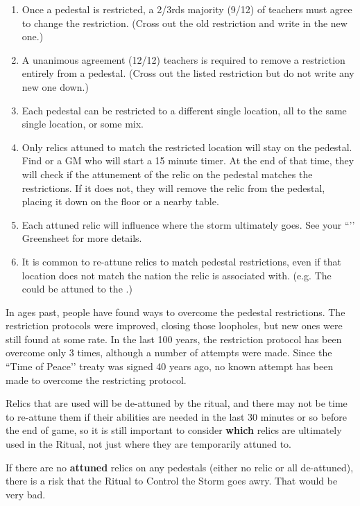 \documentclass[green]{GL2020}
\begin{document}
\begin{enumerate}
\begin{enumerate}
	\item Once a pedestal is restricted, a 2/3rds majority (9/12) of teachers must agree to change the restriction. (Cross out the old restriction and write in the new one.)
	\item  A unanimous agreement (12/12) teachers is required to remove a restriction entirely from a pedestal. (Cross out the listed restriction  but do not write any new one down.)
	\item  Each pedestal can be restricted to a different single location, all to the same single location, or some mix.
	\item Only relics attuned to match the restricted location will stay on the pedestal. Find \cPrincipal{} or a GM who will start a 15 minute timer. At the end of that time, they will check if the attunement of the relic on the pedestal matches the restrictions. If it does not, they will remove the relic from the pedestal, placing it down on the floor or a nearby table.
	\item Each attuned relic will influence where the storm ultimately goes. See your ``\gVotingStones{}’’ Greensheet for more details.
	\item It is common to re-attune relics to match pedestal restrictions, even if that location does not match the nation the relic is associated with. (e.g. The \iPitcher{} could be attuned to the \pShip{}.)
\end{enumerate}
\end{enumerate}

In ages past, people have found ways to overcome the pedestal restrictions. The restriction protocols were improved, closing those loopholes, but new ones were still found at some rate. In the last 100 years, the restriction protocol has been overcome only 3 times, although a number of attempts were made. Since the ``Time of Peace’’ treaty was signed 40 years ago, no known attempt has been made to overcome the restricting protocol.

Relics that are used will be de-attuned by the ritual, and there may not be time to re-attune them if their abilities are needed in the last 30 minutes or so before the end of game, so it is still important to consider \textbf{which} relics are ultimately used in the Ritual, not just where they are temporarily attuned to.

If there are no \textbf{attuned} relics on any pedestals (either no relic or all de-attuned), there is a risk that the Ritual to Control the Storm goes awry. That would be very bad.
\end{document}
